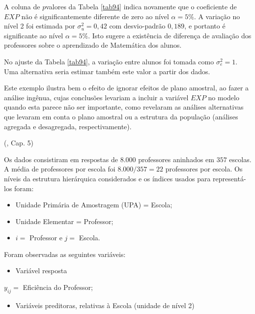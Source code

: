 \documentclass[]{book}
\providecommand{\tightlist}{%
  \setlength{\itemsep}{0pt}\setlength{\parskip}{0pt}}
\numberwithin{example}{chapter}
\numberwithin{remark}{chapter}
\numberwithin{definition}{chapter}
\let\BeginKnitrBlock\begin \let\EndKnitrBlock\end
\begin{document}
A coluna de \(p\)valores da Tabela \ref{tab94} indica novamente que o
coeficiente de \(EXP\) não é significantemente diferente de zero ao
nível \(\alpha =5\%\). A variação no nível 2 foi estimada por
\(\sigma_{u}^{2}=0,42\) com desvio-padrão \(0,189\), e portanto é
significante ao nível \(\alpha =5\%\). Isto sugere a existência de
diferença de avaliação dos professores sobre o aprendizado de Matemática
dos alunos.

No ajuste da Tabela \ref{tab94}, a variação entre alunos foi tomada como
\(\sigma _{e}^{2}=1.\) Uma alternativa seria estimar também este valor a
partir dos dados.

Este exemplo ilustra bem o efeito de ignorar efeitos de plano amostral,
ao fazer a análise ingênua, cujas conclusões levariam a incluir a
variável \(EXP\) no modelo quando esta parece não ser importante, como
revelaram as análises alternativas que levaram em conta o plano amostral
ou a estrutura da população (análises agregada e desagregada,
respectivamente).\pagebreak 

\BeginKnitrBlock{example}
\protect\hypertarget{ex:unnamed-chunk-138}{}{\label{ex:unnamed-chunk-138}}(\citep{bryk},
Cap. 5)
\EndKnitrBlock{example}

Os dados consistiram em respostas de \(8.000\) professores aninhados em
\(357\) escolas. A média de professores por escola foi \(8.000/357=22\)
professores por escola. Os níveis da estrutura hierárquica considerados
e os índices usados para representá-los foram:

\begin{itemize}
\item
  Unidade Primária de Amostragem (UPA) = Escola;
\item
  Unidade Elementar = Professor;
\item
  \(i=\) Professor e \(j=\) Escola.
\end{itemize}

Foram observadas as seguintes variáveis:

\begin{itemize}
\tightlist
\item
  Variável resposta
\end{itemize}

\(y_{ij}=\) Eficiência do Professor;

\begin{itemize}
\tightlist
\item
  Variáveis preditoras, relativas à Escola (unidade de nível 2)
\end{itemize}
\end{document}
